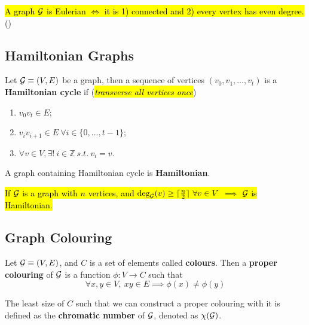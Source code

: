 \documentclass{article}
\def\Z{{\mathbb Z}}
\begin{document}
			\begin{theorem}
				\hl{A graph $\mathcal{{G}}$ is Eulerian $\iff$ it is 1) connected and 2) every vertex has even degree.}()
			\end{theorem}
		
		\subsection{Hamiltonian Graphs}
			\begin{definition}
				Let $\mathcal{{G}} \equiv (V, E)$ be a graph, then a sequence of vertices $(v_0, v_1, \dots, v_t)$ is a \textbf{Hamiltonian cycle} if (\hl{\emph{transverse all vertices once}})
				\begin{enumerate}
					\item $v_0 v_t \in E$;
					\item $v_i v_{i+1} \in E\ \forall i \in \{0, \dots, t-1\}$;
					\item $\forall v \in V, \exists!\ i \in \Z\ s.t.\ v_i = v$.
				\end{enumerate}
			\end{definition}
			
			\begin{definition}
				A graph containing Hamiltonian cycle is \textbf{Hamiltonian}.
			\end{definition}
			
			\begin{theorem}
				\hl{If $\mathcal{{G}}$ is a graph with $n$ vertices, and $\text{{deg}}_{\mathcal{{G}}}(v) \geq \lceil \frac{n}{2} \rceil\ \forall v \in V$ $\implies$ $\mathcal{{G}}$ is Hamiltonian.}
			\end{theorem}
			
		\subsection{Graph Colouring}
			\begin{definition}
				Let $\mathcal{{G}} \equiv (V, E)$, and $C$ is a set of elements called \textbf{colours}. Then a \textbf{proper colouring} of $\mathcal{{G}}$ is a function $\phi:V \to C$ such that 
				\begin{equation}
					\forall x, y \in V,\ xy \in E \implies \phi(x) \neq \phi(y)
				\end{equation}
			\end{definition}
			
			\begin{definition}
				The least size of $C$ such that we can construct a proper colouring with it is defined as the \textbf{chromatic number} of $\mathcal{{G}}$, denoted as $\chi(\mathcal{{G}})$.
			\end{definition}
			
\end{document}
